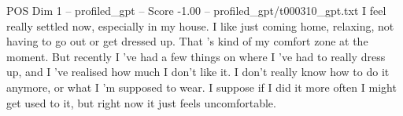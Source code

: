 \begin{textsample}{POS Dim 1 – profiled\_gpt – Score -1.00 – profiled\_gpt/t000310\_gpt.txt}  \label{ex:f1_pos_031}
I feel really settled now, especially in my house.
I like just coming home, relaxing, not having to go out or get dressed up.
That ’s kind of my comfort zone at the moment.
But recently I ’ve had a few things on where I ’ve had to really dress up, and I ’ve realised how much I don't like it.
I don't really know how to do it anymore, or what I ’m supposed to wear.
I suppose if I did it more often I might get used to it, but right now it just feels uncomfortable.

\end{textsample}
